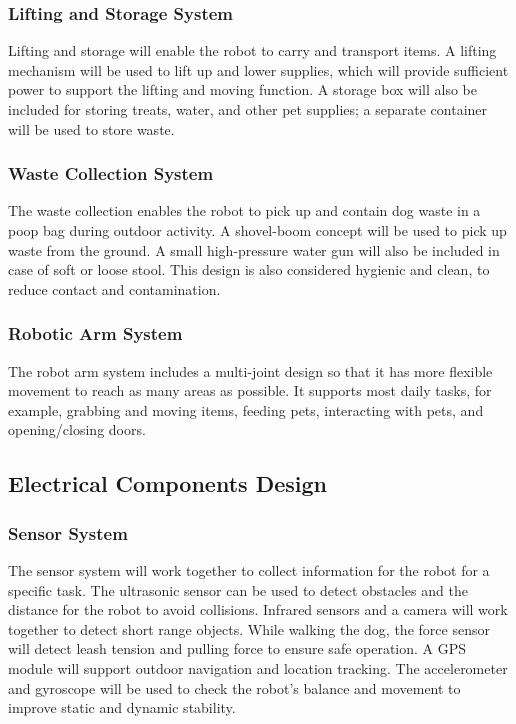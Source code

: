 \documentclass[conference,letterpaper]{IEEEtran}
\begin{document}
\subsubsection{Lifting and Storage System}

Lifting and storage will enable the robot to carry and transport items. A lifting mechanism will be used to lift up and lower supplies, which will provide sufficient power to support the lifting and moving function. A storage box will also be included for storing treats, water, and other pet supplies; a separate container will be used to store waste.

\subsubsection{Waste Collection System}

The waste collection enables the robot to pick up and contain dog waste in a poop bag during outdoor activity. A shovel-boom concept will be used to pick up waste from the ground. A small high-pressure water gun will also be included in case of soft or loose stool. This design is also considered hygienic and clean, to reduce contact and contamination.

\subsubsection{Robotic Arm System}

The robot arm system includes a multi-joint design so that it has more flexible movement to reach as many areas as possible. It supports most daily tasks, for example, grabbing and moving items, feeding pets, interacting with pets, and opening/closing doors.

\subsection{Electrical Components Design}

\subsubsection{Sensor System}

The sensor system will work together to collect information for the robot for a specific task. The ultrasonic sensor can be used to detect obstacles and the distance for the robot to avoid collisions. Infrared sensors and a camera will work together to detect short range objects. While walking the dog, the force sensor will detect leash tension and pulling force to ensure safe operation. A GPS module will support outdoor navigation and location tracking. The accelerometer and gyroscope will be used to check the robot’s balance and movement to improve static and dynamic stability.
\end{document}
